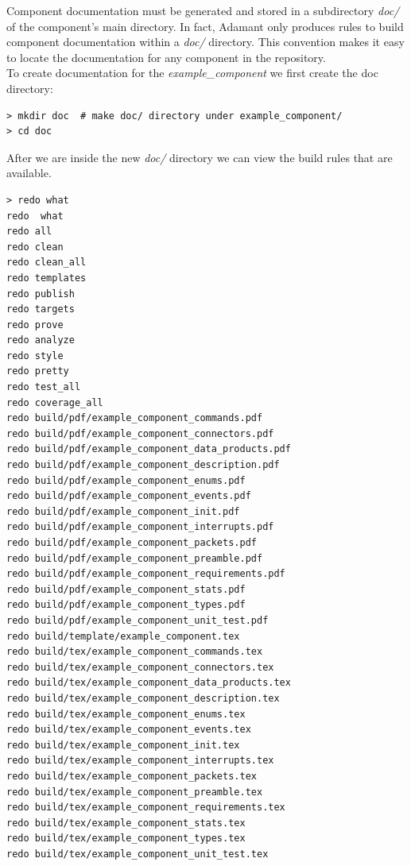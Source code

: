 Component documentation must be generated and stored in a subdirectory \textit{doc/} of the component's main directory. In fact, Adamant only produces rules to build component documentation within a \textit{doc/} directory. This convention makes it easy to locate the documentation for any component in the repository. \\

To create documentation for the \textit{example\_component} we first create the doc directory:

\vspace{5mm} %
\begin{verbatim}
> mkdir doc  # make doc/ directory under example_component/
> cd doc
\end{verbatim}
\vspace{5mm} %

After we are inside the new \textit{doc/} directory we can view the build rules that are available.

\vspace{5mm} %
\begin{verbatim}
> redo what
redo  what
redo all
redo clean
redo clean_all
redo templates
redo publish
redo targets
redo prove
redo analyze
redo style
redo pretty
redo test_all
redo coverage_all
redo build/pdf/example_component_commands.pdf
redo build/pdf/example_component_connectors.pdf
redo build/pdf/example_component_data_products.pdf
redo build/pdf/example_component_description.pdf
redo build/pdf/example_component_enums.pdf
redo build/pdf/example_component_events.pdf
redo build/pdf/example_component_init.pdf
redo build/pdf/example_component_interrupts.pdf
redo build/pdf/example_component_packets.pdf
redo build/pdf/example_component_preamble.pdf
redo build/pdf/example_component_requirements.pdf
redo build/pdf/example_component_stats.pdf
redo build/pdf/example_component_types.pdf
redo build/pdf/example_component_unit_test.pdf
redo build/template/example_component.tex
redo build/tex/example_component_commands.tex
redo build/tex/example_component_connectors.tex
redo build/tex/example_component_data_products.tex
redo build/tex/example_component_description.tex
redo build/tex/example_component_enums.tex
redo build/tex/example_component_events.tex
redo build/tex/example_component_init.tex
redo build/tex/example_component_interrupts.tex
redo build/tex/example_component_packets.tex
redo build/tex/example_component_preamble.tex
redo build/tex/example_component_requirements.tex
redo build/tex/example_component_stats.tex
redo build/tex/example_component_types.tex
redo build/tex/example_component_unit_test.tex
\end{verbatim}
\vspace{5mm} %

